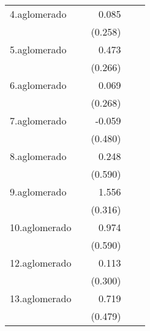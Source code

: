 {\begin{longtable}{l*{4}{D{.}{.}{-1}}}
\addlinespace
4.aglomerado&                     &       0.085         &                     &                     \\
            &                     &     (0.258)         &                     &                     \\
\addlinespace
5.aglomerado&                     &       0.473         &                     &                     \\
            &                     &     (0.266)         &                     &                     \\
\addlinespace
6.aglomerado&                     &       0.069         &                     &                     \\
            &                     &     (0.268)         &                     &                     \\
\addlinespace
7.aglomerado&                     &      -0.059         &                     &                     \\
            &                     &     (0.480)         &                     &                     \\
\addlinespace
8.aglomerado&                     &       0.248         &                     &                     \\
            &                     &     (0.590)         &                     &                     \\
\addlinespace
9.aglomerado&                     &       1.556\sym{***}&                     &                     \\
            &                     &     (0.316)         &                     &                     \\
\addlinespace
10.aglomerado&                     &       0.974         &                     &                     \\
            &                     &     (0.590)         &                     &                     \\
\addlinespace
12.aglomerado&                     &       0.113         &                     &                     \\
            &                     &     (0.300)         &                     &                     \\
\addlinespace
13.aglomerado&                     &       0.719         &                     &                     \\
            &                     &     (0.479)         &                     &                     \\

\end{longtable}}
